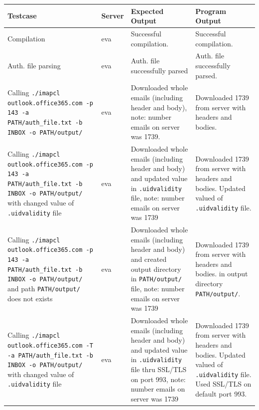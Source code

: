 \documentclass[a4paper,11pt]{article}
\begin{document}
\begin{center}
    \vspace{0.5cm} %
    \begin{tabularx}{\textwidth}{|>{\raggedright\arraybackslash}p{5cm}|>{\raggedright\arraybackslash}p{1cm}|>{\raggedright\arraybackslash}p{5cm}|>{\raggedright\arraybackslash}X|}
        \hline
        \textbf{Testcase} & \textbf{Server} & \textbf{Expected Output} & \textbf{Program Output} \\
        \hline
        Compilation & eva & Successful compilation. & Successful compilation. \\
        \hline
        Auth. file parsing & eva & Auth. file successfully parsed & Auth. file successfully parsed. \\
        \hline
        Calling \texttt{./imapcl outlook.office365.com -p 143 -a PATH/auth\_file.txt -b INBOX -o PATH/output/} & eva & Downloaded whole emails (including header and body), note: number emails on server was 1739. & Downloaded 1739 from server with headers and bodies. \\
        \hline
        Calling \texttt{./imapcl outlook.office365.com -p 143 -a PATH/auth\_file.txt -b INBOX -o PATH/output/} with changed value of \texttt{.uidvalidity} file & eva & Downloaded whole emails (including header and body) and updated value in \texttt{.uidvalidity} file, note: number emails on server was 1739 & Downloaded 1739 from server with headers and bodies. Updated valued of \texttt{.uidvalidity} file. \\
        \hline
        Calling \texttt{./imapcl outlook.office365.com -p 143 -a PATH/auth\_file.txt -b INBOX -o PATH/output/} and path \texttt{PATH/output/} does not exists & eva & Downloaded whole emails (including header and body) and created output directory in \texttt{PATH/output/} file, note: number emails on server was 1739 & Downloaded 1739 from server with headers and bodies. in output directory \texttt{PATH/output/}. \\
        \hline
        Calling \texttt{./imapcl outlook.office365.com -T -a PATH/auth\_file.txt -b INBOX -o PATH/output/} with changed value of \texttt{.uidvalidity} file & eva & Downloaded whole emails (including header and body) and updated value in \texttt{.uidvalidity} file thru SSL/TLS on port 993, note: number emails on server was 1739 & Downloaded 1739 from server with headers and bodies. Updated valued of \texttt{.uidvalidity} file. Used SSL/TLS on default port 993.\\
        \hline

\end{tabularx}
\end{center}
\end{document}
